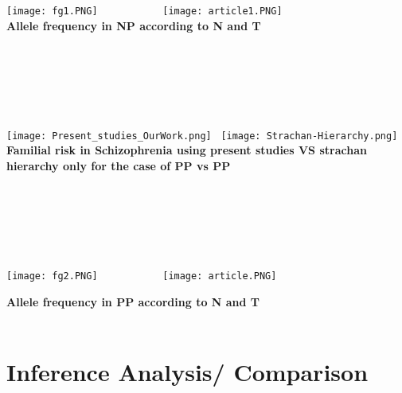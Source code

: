 \documentclass{article}
\begin{document}
\texttt{[image: fg1.PNG]} \  \ \ \ \ \ \ \ \ \ \
\texttt{[image: article1.PNG]} 
\newline
\\
\textbf{Allele frequency in NP according to N and T}
\newline
\\
\\
\\
\\
\\
\\
\\
\newline
\texttt{[image: Present\_studies\_OurWork.png]}
\  
\texttt{[image: Strachan-Hierarchy.png]} 
\newline
\\
\textbf{Familial risk in Schizophrenia using present studies VS strachan hierarchy only for the case of PP vs PP}
\\
\\
\\
\\
\\
\\
\\
\newline
\newline
\texttt{[image: fg2.PNG]} \  \ \ \ \ \ \ \ \ \ \
\texttt{[image: article.PNG]} 

\textbf{Allele frequency in PP according to N and T} \\ \\
\newpage
\section{Inference Analysis/ Comparison}
\end{document}
